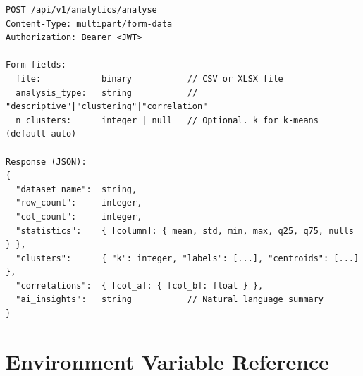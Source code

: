\begin{verbatim}
POST /api/v1/analytics/analyse
Content-Type: multipart/form-data
Authorization: Bearer <JWT>

Form fields:
  file:            binary           // CSV or XLSX file
  analysis_type:   string           // "descriptive"|"clustering"|"correlation"
  n_clusters:      integer | null   // Optional. k for k-means (default auto)

Response (JSON):
{
  "dataset_name":  string,
  "row_count":     integer,
  "col_count":     integer,
  "statistics":    { [column]: { mean, std, min, max, q25, q75, nulls } },
  "clusters":      { "k": integer, "labels": [...], "centroids": [...] },
  "correlations":  { [col_a]: { [col_b]: float } },
  "ai_insights":   string           // Natural language summary
}
\end{verbatim}

\section{Environment Variable Reference}
\label{sec:env-vars}

